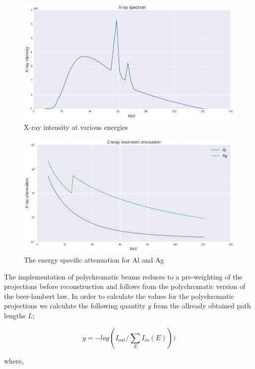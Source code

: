 \documentclass[
  twoside,
  11pt, a4paper,
  footinclude=true,
  headinclude=true,
  cleardoublepage=empty
]{scrbook}
\begin{document}
\begin{figure}[h!]
  \centering
    \includegraphics[width=\textwidth]{code/Polychromatic/Spectrum_Atenuation_Plots_files/Spectrum_Atenuation_Plots_3_0.png}
    \caption{X-ray intensity at various energies}
    \label{spectrum}
\end{figure}

\begin{figure}[h!]
  \centering
    \includegraphics[width=\textwidth]{code/Polychromatic/Spectrum_Atenuation_Plots_files/Spectrum_Atenuation_Plots_2_0.png}
    \caption{The energy specific attenuation for Al and Ag}
    \label{mu}
\end{figure}


The implementation of polychromatic beams reduces to a pre-weighting of the projections before reconstruction and follows from the polychromatic version of the beer-lambert law. In order to calculate the values for the polychromatic projections we calculate the following quantity $y$ from the allready obtained path lengths $L$;

\[
y = -log(I_{out}/\sum_E I_{in}(E)))
\]

where,
\end{document}
